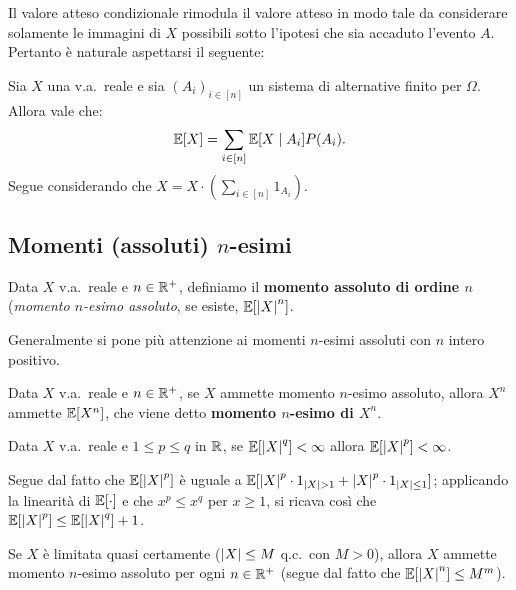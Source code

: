 \begin{multicols*}{2}
Il valore atteso condizionale rimodula il valore atteso in modo
tale da considerare solamente le immagini di $X$ possibili sotto
l'ipotesi che sia accaduto l'evento $A$. Pertanto è naturale
aspettarsi il seguente:

\begin{lemma}
    Sia $X$ una v.a.~reale e sia $(A_i)_{i \in [n]}$ un sistema di alternative
    finito per $\Omega$. Allora vale che:
    \[
        \mathbb{E}[X] = \sum_{i \in [n]} \mathbb{E}[X \mid A_i] P(A_i).
    \]
    Segue considerando che $X = X \cdot (\sum_{i \in [n]} 1_{A_i})$.
\end{lemma}

\subsection{Momenti (assoluti) \texorpdfstring{$n$}{n}-esimi}

\begin{definition}
    Data $X$ v.a.~reale e $n \in \mathbb{R}^+$, definiamo il
    \textbf{momento assoluto di ordine $n$} (\textit{momento
    $n$-esimo assoluto}, se esiste, $\mathbb{E}[\left\lvert X \right\rvert^n]$. \smallskip

    Generalmente si pone più attenzione ai momenti $n$-esimi assoluti
    con $n$ intero positivo.
\end{definition}

\begin{definition}
    Data $X$ v.a.~reale e $n \in \mathbb{R}^+$, se $X$ ammette
    momento $n$-esimo assoluto, allora $X^n$ ammette
    $\mathbb{E}[X^n]$, che viene detto \textbf{momento $n$-esimo di $X^n$}.
\end{definition}

\begin{lemma}
    Data $X$ v.a.~reale e $1 \leq p \leq q$ in $\mathbb{R}$,
    se $\mathbb{E}[\left\lvert X \right\rvert^q] < \infty$ allora
    $\mathbb{E}[\left\lvert X \right\rvert^p] < \infty$. \smallskip

    Segue dal fatto che $\mathbb{E}[\left\lvert X \right\rvert^p]$ è uguale
    a $\mathbb{E}[\left\lvert X \right\rvert^p \cdot 1_{{\left\lvert X \right\rvert> 1}} + \left\lvert X \right\rvert^p \cdot 1_{{\left\lvert X \right\rvert \leq 1}}]$;
    applicando la linearità di $\mathbb{E}[\cdot]$ e che $x^p \leq x^q$ per $x \geq 1$, si
    ricava così che $\mathbb{E}[\left\lvert X \right\rvert^p] \leq \mathbb{E}[\left\lvert X \right\rvert^q] + 1$.
\end{lemma}

\begin{remark}
    Se $X$ è limitata quasi certamente ($\left\lvert X \right\rvert \leq M$ q.c.~con $M > 0$),
    allora $X$ ammette momento $n$-esimo assoluto per ogni $n \in \mathbb{R}^+$
    (segue dal fatto che $\mathbb{E}[\left\lvert X \right\rvert^n] \leq M^m$).
\end{remark}


\end{multicols*}
